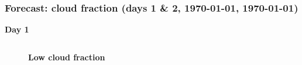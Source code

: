 \documentclass[aspectratio=169, 10pt]{beamer}
\begin{document}
\begin{frame}
\frametitle{Forecast: cloud fraction (days 1 \& 2, {\AdvanceDate[+1]\today}, {\AdvanceDate[+2]\today})}
\vspace{-.4cm}
\begin{center}
\textbf{Day 1}
\end{center}
\vspace{-.75cm}

\begin{columns}
\begin{column}{0.33\textwidth}
\begin{figure}
\textbf{\tiny Low cloud fraction} \\
\end{figure}
\end{column}


\end{columns}
\end{frame}
\end{document}
